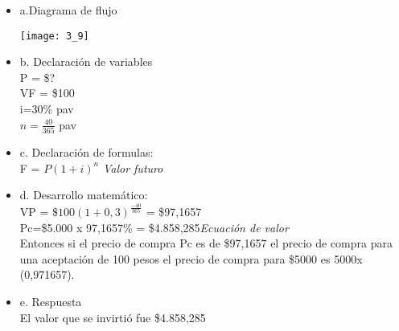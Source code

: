 	\begin{itemize}
		\item a.Diagrama de flujo\\
		\begin{center}
			\texttt{[image: 3\_9]}
		\end{center}	
		\item b. Declaración de variables\\
		
		P = \$? \\
		VF = \$100\\
		i=30\% pav\\
		$n = \frac{40}{365}$ pav	       
		\item c. Declaración de formulas:\\
		
		F =  $P(1+i)^n$ \hspace{35}\textit{Valor futuro}\\
		\item d. Desarrollo matemático:\\
		
		VP = $\$100(1+0,3)^\frac{-40}{365}$ = \$97,1657\\
		Pc=\$5.000 x 97,1657\% = \$4.858,285\hspace{35}\textit{Ecuación de valor}\\
		Entonces si el precio de compra Pc es de \$97,1657 el precio de compra para una aceptación de 100 pesos el precio de compra para \$5000 es 5000x (0,971657).\\
		
		\item e. Respuesta\\
		El valor que se invirtió fue \$4.858,285\\
	\end{itemize}
	
